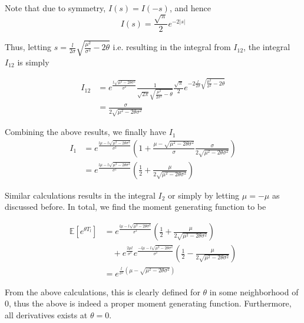 \documentclass[../Thesis.tex]{subfiles}
\begin{document}
Note that due to symmetry, $I(s) = I(-s)$, and hence
$$ I(s) = \frac{\sqrt{\pi}}{2} e^{-2 \left|s\right|} $$

Thus, letting $s = \frac{l}{2\sigma} \sqrt{ \frac{\mu^2}{\sigma^2} -2\theta} $ i.e. resulting in the integral from $I_{12}$, the integral $I_{12}$ is simply

\begin{align*}
    I_{12} & = e^{\frac{l\sqrt{\mu^2 - 2\theta \sigma^2} }{\sigma^2}}\frac{1}{\sqrt{2\pi} \sqrt{\frac{\mu^2}{2\sigma^2} - \theta}} \frac{\sqrt{\pi}}{2} e^{-2 \frac{l}{2\sigma} \sqrt{ \frac{\mu^2}{\sigma^2} -2\theta}} \\
           & =\frac{\sigma}{2\sqrt{\mu^2 -2\theta \sigma^2 } }
\end{align*}

Combining the above results, we finally have $I_1$
\begin{align*}
    I_1 & = e^{\frac{l\mu - l \sqrt{\mu^2 - 2\theta \sigma^2}}{\sigma^2}} \left(1 +  \frac{\mu - \sqrt{\mu^2 - 2\theta \sigma^2}}{\sigma} \frac{\sigma}{2\sqrt{\mu^2 -2\theta \sigma^2 } } \right) \\
        & = e^{\frac{l\mu - l \sqrt{\mu^2 - 2\theta \sigma^2}}{\sigma^2}}  \left( \frac{1}{2} + \frac{\mu}{2\sqrt{\mu^2 - 2\theta \sigma^2}}\right)
\end{align*}


Similar calculations results in the integral $I_2$ or simply by letting $\mu = -\mu $ as discussed before. In total, we find the moment generating function to be

\begin{align*}
    \mathbb{E}\left[e^{\theta T_l}\right] & = e^{\frac{l\mu - l \sqrt{\mu^2 - 2\theta \sigma^2}}{\sigma^2}}  \left( \frac{1}{2} + \frac{\mu}{2\sqrt{\mu^2 - 2\theta \sigma^2}}\right)                                    \\
                                          & \quad + e^{\frac{2\mu l}{\sigma^2}} e^{\frac{-l\mu - l \sqrt{\mu^2 - 2\theta \sigma^2}}{\sigma^2}}  \left( \frac{1}{2} - \frac{\mu}{2\sqrt{\mu^2 - 2\theta \sigma^2}}\right) \\
                                          & = e^{\frac{l}{\sigma^2} \left( \mu - \sqrt{\mu^2 - 2 \theta \sigma^2}\right)}
\end{align*}

From the above calculations, this is clearly defined for $\theta$ in some neighborhood of $0$, thus the above is indeed a proper moment generating function. Furthermore, all derivatives exists at $\theta = 0$.
\end{document}
